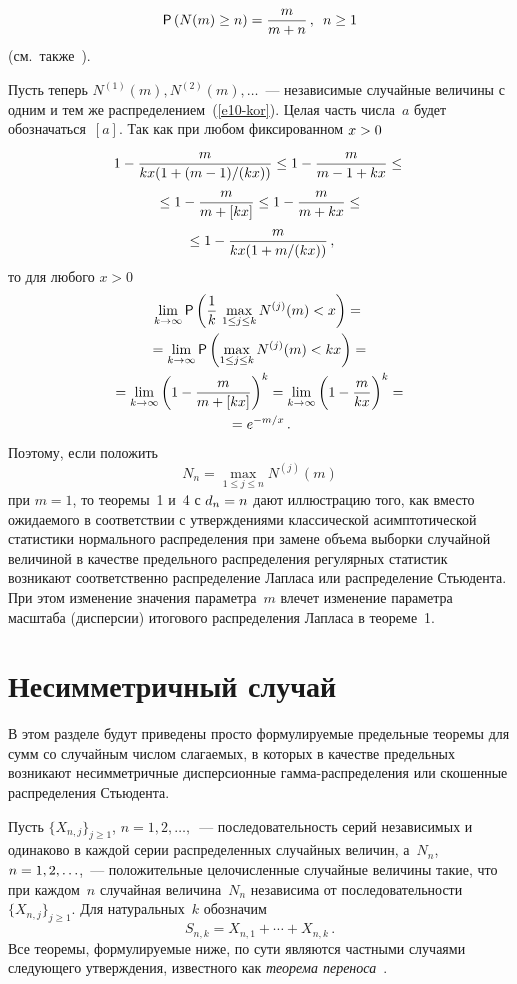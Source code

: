 \begin{multicols}{2}
\noindent
\begin{equation}
{\sf P}\left(N(m)\ge n\right)=\displaystyle\frac{\displaystyle m\mathstrut}{\displaystyle m+n\mathstrut}\,,\enskip  n\ge1\label{e10-kor}
\end{equation}
(см.\ так\-же~\cite[с.~85]{Nevzorov2000}).

\pagebreak

Пусть теперь $N^{(1)}(m),N^{(2)}(m),\ldots$~--- независимые
случайные величины с одним и тем же распределением~(\ref{e10-kor}). Целая
часть чис\-ла~$a$ будет обозначаться~$[a]$. Так как при любом
фиксированном $x\hm>0$
\begin{multline*}
1-\displaystyle\frac{\displaystyle m\mathstrut}{\displaystyle kx(1+(m-1)/(kx))\mathstrut}\le 1-\displaystyle\frac{\displaystyle m\mathstrut}{\displaystyle m-1+kx\mathstrut}\le{}\\
{}\le
1-\displaystyle\frac{\displaystyle m\mathstrut}{\displaystyle m+[kx]\mathstrut}\le  1-\displaystyle\frac{\displaystyle m\mathstrut}{\displaystyle m+kx\mathstrut}\le{}\\
{}\le
1-\displaystyle\frac{\displaystyle m\mathstrut}{\displaystyle kx(1+m/(kx))\mathstrut}\,,
\end{multline*}
то для любого $x>0$
\begin{multline*}
\lim_{k\to\infty}{\sf P}\left(\displaystyle\frac{\displaystyle 1\mathstrut}{\displaystyle k\mathstrut}\,\max\limits_{1\le j\le k}N^{(j)}(m)<x\right)= {}\\
{}=
\lim_{k\to\infty}{\sf P}\left(\max_{1\le j\le
k}N^{(j)}(m)<kx\right)={}\\
{}=
\lim\limits_{k\to\infty}\left(1-\displaystyle\frac{\displaystyle m\mathstrut}{\displaystyle m+[kx]\mathstrut}\right)^k=
\lim\limits_{k\to\infty}\left(1-\displaystyle\frac{\displaystyle m\mathstrut}{\displaystyle kx\mathstrut}\right)^k={}\\
{}=e^{-m/x}\,.
\end{multline*}
Поэтому, если положить
$$
N_n=\max\limits_{1\le j\le n}N^{(j)}(m)
$$
при $m=1$, то теоремы~1 и~4 с $d_n\hm=n$ дают иллюстрацию того, как
вместо ожидаемого в соответствии с утверждениями классической
асимптотической статистики нормального распределения при замене
объема выборки случайной величиной в качестве предельного
распределения регулярных статистик возникают соответственно
распределение Лапласа или распределение Стьюдента. При этом
изменение значения параметра~$m$ влечет изменение параметра
масштаба (дисперсии) итогового распределения Лапласа в теореме~1.

\section{Несимметричный случай}

В этом разделе будут приведены просто формулируемые предельные
теоремы для сумм со случайным числом слагаемых, в которых в
качестве предель\-ных возникают несимметричные дисперсионные
гам\-ма-рас\-пре\-де\-ле\-ния или скошенные распределения Стьюдента.

Пусть $\{X_{n,j}\}_{j\ge1}$, $n=1,2,\ldots ,$~--- последовательность
серий независимых и одинаково в каждой серии распределенных
случайных величин, а~$N_n$, $n\hm=1,2,\ldots$,~--- положительные
целочисленные случайные величины такие, что при каждом~$n$
случайная величина~$N_n$ независима от по\-сле\-до\-ва\-тель\-ности
$\{X_{n,j}\}_{j\ge1}$. Для натуральных~$k$ обозначим
$$
S_{n,k}=X_{n,1}+\cdots+X_{n,k}\,.
$$
Все теоремы,
фор\-му\-ли\-ру\-емые ниже, по сути являются частными случаями следующего
утверждения, известного как \textit{теорема переноса}~\cite{GnedenkoFahim1969}.


\end{multicols}
